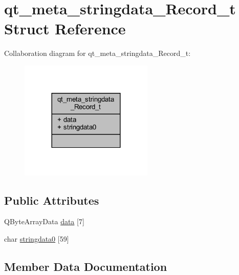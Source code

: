 \hypertarget{structqt__meta__stringdata___record__t}{}\section{qt\+\_\+meta\+\_\+stringdata\+\_\+\+Record\+\_\+t Struct Reference}
\label{structqt__meta__stringdata___record__t}


Collaboration diagram for qt\+\_\+meta\+\_\+stringdata\+\_\+\+Record\+\_\+t\+:
\nopagebreak
\begin{figure}[H]
\begin{center}
\leavevmode
\includegraphics[width=180pt]{structqt__meta__stringdata___record__t__coll__graph}
\end{center}
\end{figure}
\subsection*{Public Attributes}
\begin{DoxyCompactItemize}
\item 
Q\+Byte\+Array\+Data \mbox{\hyperlink{structqt__meta__stringdata___record__t_a05ea6e02c77e3db28187501ace6bfd91}{data}} \mbox{[}7\mbox{]}
\item 
char \mbox{\hyperlink{structqt__meta__stringdata___record__t_a76c89ce986c1b003262fedde8da4ebe6}{stringdata0}} \mbox{[}59\mbox{]}
\end{DoxyCompactItemize}


\subsection{Member Data Documentation}
\mbox{\label{structqt__meta__stringdata___record__t_a05ea6e02c77e3db28187501ace6bfd91}} 
